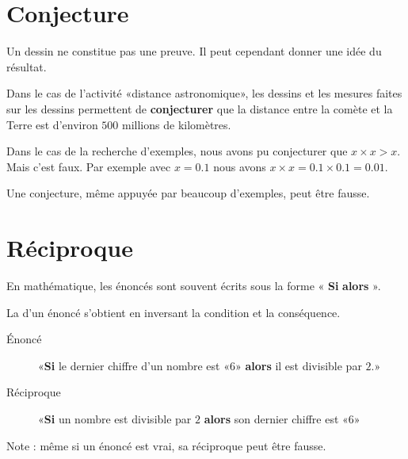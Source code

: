 


\section{Conjecture}

\begin{Aretenir}
    Un dessin ne constitue pas une preuve. Il peut cependant donner une idée du résultat.
\end{Aretenir}

Dans le cas de l'activité «distance astronomique», les dessins et les mesures faites sur les dessins permettent de {\bf conjecturer} que la distance entre la comète et la Terre est d'environ \( 500\) millions de kilomètres.

Dans le cas de la recherche d'exemples, nous avons pu conjecturer que \( x\times x >x\). Mais c'est faux. Par exemple avec \( x=0.1\) nous avons \( x\times x=0.1\times 0.1=0.01\).

\begin{Aretenir}
    Une conjecture, même appuyée par beaucoup d'exemples, peut être fausse.
\end{Aretenir}

\section{Réciproque}

En mathématique, les énoncés sont souvent écrits sous la forme « {\bf Si}  {\bf alors} ».

\begin{definition}
    La  d'un énoncé s'obtient en inversant la condition et la conséquence.
\end{definition}

\begin{example}
    \begin{description}
        \item[Énoncé] «{\bf Si} le dernier chiffre d'un nombre est «\( 6\)» {\bf alors} il est divisible par \( 2\).» 
        \item[Réciproque] «{\bf Si} un nombre est divisible par \( 2\) {\bf alors} son dernier chiffre est «\( 6\)» 
    \end{description}
    Note : même si un énoncé est vrai, sa réciproque peut être fausse.
\end{example}
